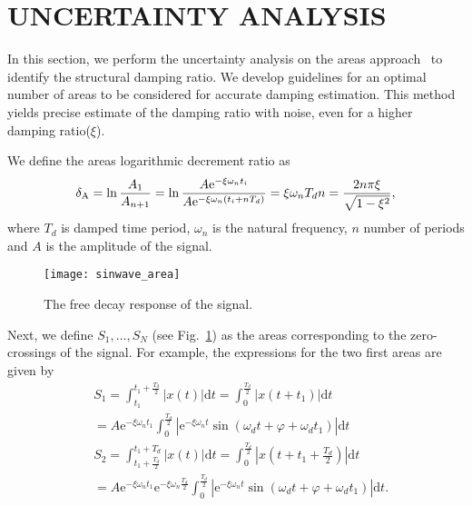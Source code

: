 \section{UNCERTAINTY ANALYSIS}
\label{sec:method}

In this section, we perform the uncertainty analysis on the areas approach~\cite{Huang2007} to identify the structural damping ratio. 
We develop guidelines for an optimal number of areas to be considered for accurate damping estimation. This method yields precise estimate of the damping ratio with noise, even for a higher damping ratio($\xi$).

We define the areas logarithmic decrement ratio as
\begin{equation}
\delta_{\rm A}=\ln \frac{A_{1}}{A_{n+1}}=\ln \frac{A \mathrm{e}^{-\xi \omega_{n} t_{i}}}{A \mathrm{e}^{-\xi \omega_{n}\left(t_{i}+n T_{d}\right)}}=\xi \omega_{n} T_{d} n=\frac{2 n \pi \xi}{\sqrt{1-\xi^{2}}},
\end{equation}
where $T_d$ is damped time period, $\omega_{n}$ is the natural frequency, $n$ number of periods and $A$ is the amplitude of the signal.
\begin{figure}[h]
\label{sin}
\texttt{[image: sinwave\_area]}
\centering
\caption{The free decay response of the signal.}
\end{figure}

Next, we define $S_{1}, \ldots, S_{N}$ (see Fig.~\ref{sin}) as the areas corresponding to the zero-crossings of the signal. 
For example, the expressions for the two first areas are given by 
\begin{equation}
\label{e9}
\begin{aligned}
&S_{1}=\int_{t_{1}}^{t_{1}+\frac{T_{d}}{2}}|x(t)| \mathrm{d} t=\int_{0}^{\frac{T_{d}}{2}}\left|x\left(t+t_{1}\right)\right| \mathrm{d} t\\
&=A \mathrm{e}^{-\xi \omega_{n} t_{1}} \int_{0}^{\frac{T_{d}}{2}}\left|\mathrm{e}^{-\xi \omega_{n} t} \sin \left(\omega_{d} t+\varphi+\omega_{d} t_{1}\right)\right| \mathrm{d} t\\
&S_{2}=\int_{t_{1}+\frac{T_{d}}{2}}^{t_{1}+T_{d}}|x(t)| \mathrm{d} t=\int_{0}^{\frac{T_{d}}{2}}\left|x\left(t+t_{1}+\frac{T_{d}}{2}\right)\right| \mathrm{d} t\\
&=A \mathrm{e}^{-\xi \omega_{n} t_{1}} \mathrm{e}^{-\xi \omega_{n} \frac{T_{d}}{2}} \int_{0}^{\frac{T_{d}}{2}}\left|\mathrm{e}^{-\xi \omega_{n} t} \sin \left(\omega_{d} t+\varphi+\omega_{d} t_{1}\right)\right| \mathrm{d} t.
\end{aligned}
\end{equation}

